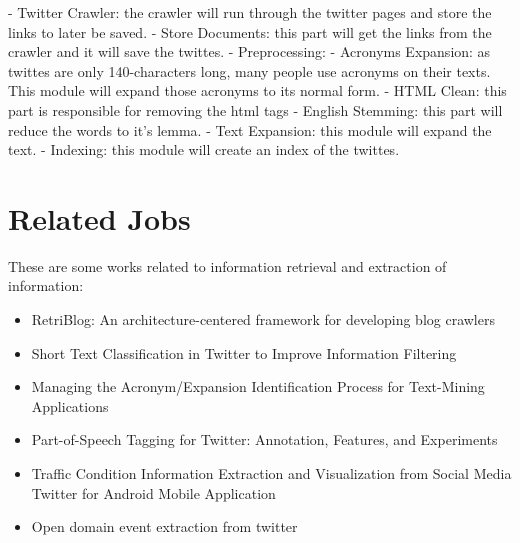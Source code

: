 \documentclass[12pt]{article}
\begin{document}
- Twitter Crawler: the crawler will run through the twitter pages and store the links to later be saved.
- Store Documents: this part will get the links from the crawler and it will save the twittes.
- Preprocessing: 
  - Acronyms Expansion: as twittes are only 140-characters long, many people use acronyms on their texts. This module will expand those acronyms to its normal form.
  - HTML Clean: this part is responsible for removing the html tags
  - English Stemming: this part will reduce the words to it's lemma. 
  - Text Expansion: this module will expand the text.
- Indexing: this module will create an index of the twittes.


\section{Related Jobs}
These are some works related to information retrieval and extraction of information:
\begin{itemize}
\item RetriBlog: An architecture-centered framework for developing blog crawlers \cite{Ferreira:13}
\item Short Text Classification in Twitter to Improve Information Filtering \cite{Sriram:10}
\item Managing the Acronym/Expansion Identification Process for Text-Mining Applications \cite{Roche:08} 
\item Part-of-Speech Tagging for Twitter: Annotation, Features, and Experiments \cite{Gimpel:11}
\item Traffic Condition Information Extraction and Visualization from Social Media Twitter for Android Mobile Application \cite{Endarnoto:11}
\item Open domain event extraction from twitter \cite{Ritter:12}
\end{itemize}



\end{document}
